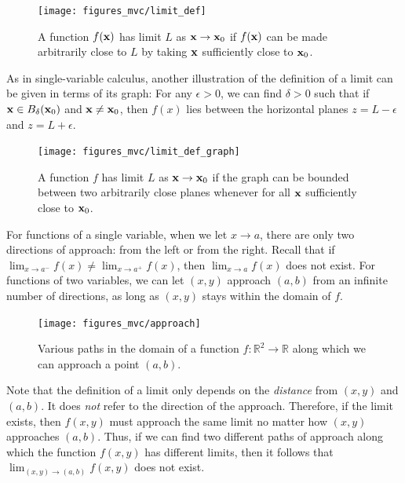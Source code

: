 \documentclass[12pt,letterpaper,reqno]{article}
\numberwithin{equation}{section}
\newcommand{\R}{\ensuremath{\mathbb R}}
\newcommand{\bx}{{\bf x}}
\begin{document}
{\begin{figure}[h]
	\begin{center}
	\texttt{[image: figures\_mvc/limit\_def]}
\end{center}
\caption{A function $f(\bx)$ has limit $L$ as $\bx \to \bx_0$ if $f(\bx)$ can be made arbitrarily close to $L$ by taking $\bx$ sufficiently close to $\bx_0$.}
\end{figure}

\newpage

As in single-variable calculus, another illustration of the definition of a limit can be given in terms of its graph: For any $\epsilon>0$, we can find $\delta>0$ such that if $\bx \in B_\delta(\bx_0)$ and $\bx \neq \bx_0$, then $f(x)$ lies between the horizontal planes $z=L-\epsilon$ and $z=L+\epsilon$.

	\begin{figure}[h]
		\begin{center}
	\texttt{[image: figures\_mvc/limit\_def\_graph]}
	\end{center}
	\caption{A function $f$ has limit $L$ as $\bx \to \bx_0$ if the graph can be bounded between two arbitrarily close planes whenever for all $\bx$ sufficiently close to $\bx_0$.}
	\end{figure}
	
For functions of a single variable, when we let $x \to a$, there are only two directions of approach: from the left or from the right. Recall that if $\lim_{x \to a^-}f(x) \neq \lim_{x \to a^+}f(x)$, then $\lim_{x \to a}f(x)$ does not exist. For functions of two variables, we can let $(x,y)$ approach $(a,b)$ from an infinite number of directions, as long as $(x,y)$ stays within the domain of $f$.
	
\begin{figure}[h]
	\begin{center}
		\texttt{[image: figures\_mvc/approach]}
	\end{center}
	\caption{Various paths in the domain of a function $f:\R^2 \to \R$ along which we can approach a point $(a,b)$.}
\end{figure}	
	
	
Note that the definition of a limit only depends on the \emph{distance} from $(x,y)$ and $(a,b)$. It does \emph{not} refer to the direction of the approach. Therefore, if the limit exists, then $f(x,y)$ must approach the same limit no matter how $(x,y)$ approaches $(a,b)$. Thus, if we can find two different paths of approach along which the function $f(x,y)$ has different limits, then it follows that $\lim_{(x,y) \to (a,b)}f(x,y)$ does not exist.

}
\end{document}
